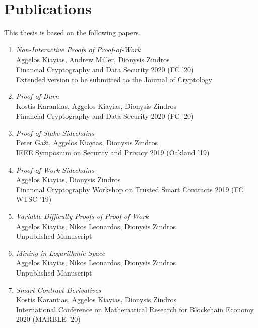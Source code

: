 \section*{Publications}

This thesis is based on the following papers.

\begin{enumerate}
  \item
    \emph{Non-Interactive Proofs of Proof-of-Work}\nocite{nipopows}\\
    Aggelos Kiayias, Andrew Miller, \underline{Dionysis Zindros}\\
    Financial Cryptography and Data Security 2020 (FC '20)\\
    Extended version to be submitted to the Journal of Cryptology
  \item
    \emph{Proof-of-Burn}\nocite{burn}\\
    Kostis Karantias, Aggelos Kiayias, \underline{Dionysis Zindros}\\
    Financial Cryptography and Data Security 2020 (FC '20)
  \item
    \emph{Proof-of-Stake Sidechains}\nocite{pos-sidechains}\\
    Peter Ga\v{z}i, Aggelos Kiayias, \underline{Dionysis Zindros}\\
    IEEE Symposium on Security and Privacy 2019 (Oakland '19)
  \item
    \emph{Proof-of-Work Sidechains}\nocite{pow-sidechains}\\
    Aggelos Kiayias, \underline{Dionysis Zindros}\\
    Financial Cryptography Workshop on Trusted Smart Contracts 2019 (FC WTSC '19)
  \item
    \emph{Variable Difficulty Proofs of Proof-of-Work}\nocite{varnipopows}\\
    Aggelos Kiayias, Nikos Leonardos, \underline{Dionysis Zindros}\\
    Unpublished Manuscript
  \item
    \emph{Mining in Logarithmic Space}\nocite{logspace}\\
    Aggelos Kiayias, Nikos Leonardos, \underline{Dionysis Zindros}\\
    Unpublished Manuscript
  \item
    \emph{Smart Contract Derivatives}\nocite{derivatives}\\
    Kostis Karantias, Aggelos Kiayias, \underline{Dionysis Zindros}\\
    International Conference on Mathematical Research for Blockchain Economy 2020 (MARBLE '20)\\
\end{enumerate}

